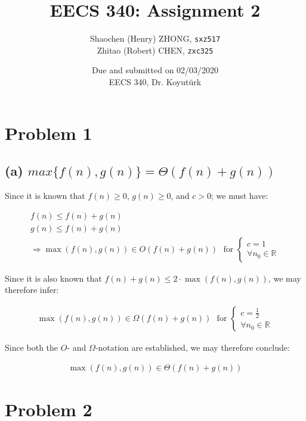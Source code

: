 \documentclass[12pt]{article}
\newcommand{\inlinecode}{\texttt}
\begin{document}
\title{\textbf{EECS 340: Assignment 2}}

\author{Shaochen (Henry) ZHONG, \inlinecode{sxz517} \\ Zhitao (Robert) CHEN, \inlinecode{zxc325}}
\date{Due and submitted on 02/03/2020 \\ EECS 340, Dr. Koyutürk}
\maketitle

\section{Problem 1}

\subsection{(a) $max\{f(n), g(n)\} = \Theta (f(n) + g(n))$}

Since it is known that $f(n) \geq 0$, $g(n) \geq 0$, and $c > 0$; we must have:

\begin{gather}
    f(n) \leq f(n) + g(n) \nonumber\\
    g(n) \leq f(n) + g(n) \nonumber\\
    \Rightarrow \max(f(n), g(n)) \in O(f(n) + g(n)) \ \ \ \text{for } \begin{cases}
                    c = 1 \\
                    \forall{n_{0}} \in \mathbb{R}
                \end{cases}
\end{gather}

Since it is also known that $f(n) + g(n) \leq 2 \cdot \max(f(n),g(n))$, we may therefore infer:

\begin{gather}
    \max(f(n), g(n)) \in \Omega(f(n) + g(n)) \ \ \ \text{for } \begin{cases}
        c = \frac{1}{2} \\
        \forall{n_{0}} \in \mathbb{R}
    \end{cases}
\end{gather}

Since both the $O$- and $\Omega$-notation are established, we may therefore conclude:

\begin{gather}
    \max(f(n), g(n)) \in \Theta (f(n) + g(n))
\end{gather}

\section{Problem 2}


%
% 
% 
\end{document}
